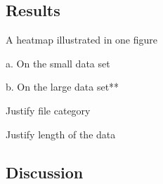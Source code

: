 \subsection{Results}

A heatmap illustrated in one figure

a. On the small data set

b. On the large data set**

Justify file category

Justify length of the data

\subsection{Discussion}
